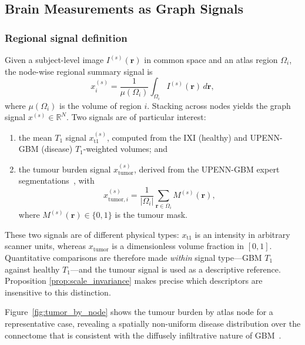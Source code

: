 \documentclass[11pt,reqno]{amsart}
\theoremstyle{plain}
\theoremstyle{definition}
\theoremstyle{remark}
\numberwithin{equation}{section}
\newcommand{\R}{\mathbb{R}}
\begin{document}
\subsection{Brain Measurements as Graph Signals}
\label{sec:signals}

\subsubsection{Regional signal definition}

Given a subject-level image $I^{(s)}(\mathbf{r})$ in common space and an atlas
region $\Omega_i$, the node-wise regional summary signal is
\begin{equation}
x_i^{(s)} = \frac{1}{\mu(\Omega_i)} \int_{\Omega_i} I^{(s)}(\mathbf{r})\,d\mathbf{r},
\end{equation}
where $\mu(\Omega_i)$ is the volume of region $i$. Stacking across nodes yields
the graph signal $x^{(s)}\in\R^{N}$. Two signals are of particular interest:

\begin{enumerate}[label=(\alph*),leftmargin=2.2em]
  \item the mean $T_1$ signal $x_{\mathrm{t1}}^{(s)}$, computed from the IXI
        (healthy) and UPENN-GBM (disease) $T_1$-weighted volumes; and
  \item the tumour burden signal $x_{\mathrm{tumor}}^{(s)}$, derived from the
        UPENN-GBM expert segmentations~\cite{bakas2022university}, with
        \begin{equation}
        x^{(s)}_{\mathrm{tumor},i}
        = \frac{1}{|\Omega_i|}\sum_{\mathbf{r}\in\Omega_i} M^{(s)}(\mathbf{r}),
        \end{equation}
        where $M^{(s)}(\mathbf{r})\in\{0,1\}$ is the tumour mask.
\end{enumerate}

These two signals are of different physical types: $x_{\mathrm{t1}}$ is an
intensity in arbitrary scanner units, whereas $x_{\mathrm{tumor}}$ is a
dimensionless volume fraction in $[0,1]$. Quantitative comparisons are therefore
made \emph{within} signal type---GBM $T_1$ against healthy $T_1$---and the
tumour signal is used as a descriptive reference. Proposition
\ref{prop:scale_invariance} makes precise which descriptors are insensitive to
this distinction.

Figure~\ref{fig:tumor_by_node} shows the tumour burden by atlas node for a
representative case, revealing a spatially non-uniform disease distribution over
the connectome that is consistent with the diffusely infiltrative nature of
GBM~\cite{louis2021who,wen2008malignant}.
\end{document}
